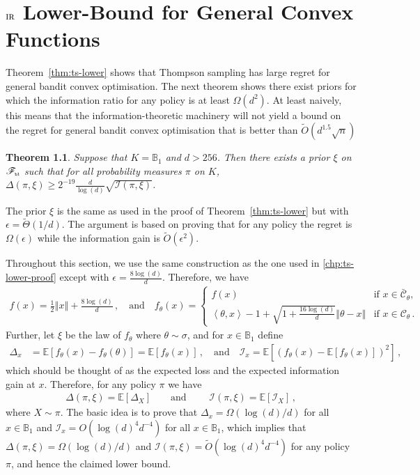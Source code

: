 \documentclass[letter, 12pt]{report}
\newcommand{\todoa}[2][]{\todo[size=\scriptsize,color=green!20!white,#1]{Alr: #2}}
\newcommand{\pb}{\text{\tiny\texttt{b}}}
\newcommand{\pl}{\text{\tiny\texttt{l}}}
\newcommand{\ip}[1]{\left \langle #1 \right \rangle}
\newcommand{\ball}{\mathbb{B}}
\newcommand{\paren}[1]{\left( #1 \right)}
\newcommand{\brak}[1]{\left[ #1 \right]}
\newcommand{\norm}[1]{\left \Vert  #1 \right \Vert}
\newcommand{\E}{\mathbb E}
\newcommand{\cC}{\mathcal C}
\newcommand{\sF}{\mathscr F}
\newcommand{\I}{\mathcal{I}}
\newcommand{\1}{\mathbf{1}}
\newcommand{\IR}{\operatorname{\textsc{ir}}}
\theoremstyle{plain}
\newtheorem{theorem}{Theorem}
\theoremstyle{definition}
\theoremstyle{remark}
\begin{document}
\chapter{$\IR$ Lower-‌‌Bound for General Convex Functions}
Theorem~\ref{thm:ts-lower} shows that Thompson sampling has large regret for general bandit convex optimisation.
The next theorem shows there exist priors for which the information ratio for any policy is at least $\Omega(d^2)$.
At least naively, this means that the information-theoretic machinery will not yield a bound on the regret for general bandit convex optimisation that
is better than $\tilde O(d^{1.5} \sqrt{n})$

\begin{theorem}\label{thm:inf-lower}
    Suppose that $K = \ball_1$ and $d>256$. Then there exists a prior $\xi$ on $\sF_{\pb\pl}$ such that for all probability measures $\pi$ on $K$,
    $\Delta(\pi, \xi) \geq 2^{-19} \frac{d}{\log(d)} \sqrt{\I(\pi, \xi)}$. %
\end{theorem}

The prior $\xi$ is the same as used in the proof of Theorem~\ref{thm:ts-lower} but with $\epsilon = \tilde \Theta(1/d)$.
The argument is based on proving that for any policy the regret is $\Omega(\epsilon)$ while the information gain is $\tilde O(\epsilon^2)$.

Throughout this section, we use the same construction as the one used in \cref{chp:ts-lower-proof}
except with $\epsilon = \frac{8\log(d)}{d}$.
Therefore, we have
\begin{align*}
    f(x)         = \frac12 \norm{x} + \frac{8\log(d)}{d}\,, \quad \text{and} \quad
    f_\theta(x)  =
    \begin{cases}
        f(x)                                                                 & \text{if } x \in \bar{\cC}_{\theta}, \\
        \ip{\theta, x} - 1 + \sqrt{1 + \frac{16\log(d)}{d}}\norm{\theta - x} & \text{if } x \in \cC_{\theta}\,.
    \end{cases}
\end{align*}
Further, let $\xi$ be the law of $f_\theta$ where $\theta \sim \sigma$,
and for $x \in \mathbb{B}_1$ define
\begin{align*}
    \Delta_x & = \E\brak{
        f_\theta(x) - f_{\theta}(\theta)
    }
    = \E\brak{
        f_\theta(x)
    }\,, \quad \text{and} \quad
    \I_x = \E\brak{
        \paren{f_\theta(x) - \E\brak{f_\theta(x)}}^2
    } \,,
\end{align*}
which should be thought of as the expected loss and the expected information gain at $x$.
Therefore, for any policy $\pi$ we have
\begin{align*}
    \Delta(\pi, \xi) = \E[\Delta_X] \qquad \text{and } \qquad
    \I(\pi, \xi) = \E[\I_X] \,,
\end{align*}
where $X \sim \pi$.
The basic idea is to prove that $\Delta_x = \Omega(\log(d)/d)$ for all
$x \in \ball_1$ and $\I_x = O(\log(d)^4 d^{-4})$ for all $x \in \ball_1$,
which implies that $\Delta(\pi, \xi) = \Omega(\log(d)/d)$ and $\I(\pi, \xi) = \tilde O(\log(d)^4 d^{-4})$
for any policy $\pi$, and hence the claimed lower bound.
\end{document}
